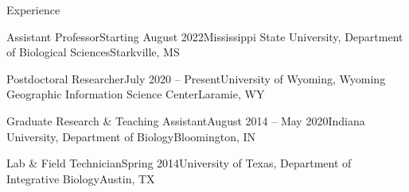 \documentclass{resume} %
\begin{document}
\begin{rSection}{Experience}

\begin{rSubsection}{Assistant Professor}{Starting August 2022}{Mississippi State University, Department of Biological Sciences}{Starkville, MS}
\end{rSubsection}

\begin{rSubsection}{Postdoctoral Researcher}{July 2020 -- Present}{University of Wyoming, Wyoming Geographic Information Science Center}{Laramie, WY}
\end{rSubsection}

\begin{rSubsection}{Graduate Research \& Teaching Assistant}{August 2014 -- May 2020}{Indiana University, Department of Biology}{Bloomington, IN}
\end{rSubsection}

\begin{rSubsection}{Lab \& Field Technician}{Spring 2014}{University of Texas, Department of Integrative Biology}{Austin, TX}
\end{rSubsection}

\end{rSection}
\bigskip
\end{document}
